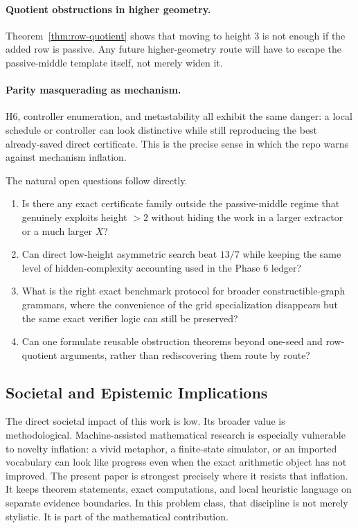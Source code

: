 \documentclass[11pt]{article}
\theoremstyle{definition}
\begin{document}
\paragraph{Quotient obstructions in higher geometry.}
Theorem~\ref{thm:row-quotient} shows that moving to height $3$ is not enough if the added row is passive. Any future higher-geometry route will have to escape the passive-middle template itself, not merely widen it.

\paragraph{Parity masquerading as mechanism.}
H6, controller enumeration, and metastability all exhibit the same danger: a local schedule or controller can look distinctive while still reproducing the best already-saved direct certificate. This is the precise sense in which the repo warns against mechanism inflation.

The natural open questions follow directly.

\begin{enumerate}
  \item Is there any exact certificate family outside the passive-middle regime that genuinely exploits height $>2$ without hiding the work in a larger extractor or a much larger $X$?
  \item Can direct low-height asymmetric search beat $13/7$ while keeping the same level of hidden-complexity accounting used in the Phase 6 ledger?
  \item What is the right exact benchmark protocol for broader constructible-graph grammars, where the convenience of the grid specialization disappears but the same exact verifier logic can still be preserved?
  \item Can one formulate reusable obstruction theorems beyond one-seed and row-quotient arguments, rather than rediscovering them route by route?
\end{enumerate}

\subsection{Societal and Epistemic Implications}

The direct societal impact of this work is low. Its broader value is methodological. Machine-assisted mathematical research is especially vulnerable to novelty inflation: a vivid metaphor, a finite-state simulator, or an imported vocabulary can look like progress even when the exact arithmetic object has not improved. The present paper is strongest precisely where it resists that inflation. It keeps theorem statements, exact computations, and local heuristic language on separate evidence boundaries. In this problem class, that discipline is not merely stylistic. It is part of the mathematical contribution.
\end{document}
